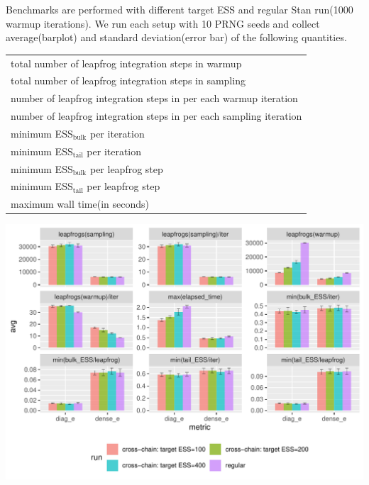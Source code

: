 \documentclass[landscape,a0paper,fontscale=0.45]{baposter} %
\newenvironment{ColFigure}
  {\par\medskip\noindent\minipage{\linewidth}}
  {\endminipage\par\medskip}
\begin{document}
\begin{poster}
{\begin{multicols}{2}
\vspace{1em}
Benchmarks are performed with different target ESS and
regular Stan run(1000 warmup iterations).
We run each setup with 10 PRNG seeds and collect average(barplot) and
standard deviation(error bar) of the following quantities.
\begin{center}
\footnotesize
\begin{tabular}{l}
\hline
total number of leapfrog integration steps in warmup \\
total number of leapfrog integration steps in sampling \\
number of leapfrog integration steps in per each warmup iteration \\
number of leapfrog integration steps in per each sampling iteration \\
minimum ESS\(_{\text{bulk}}\) per iteration \\
minimum ESS\(_{\text{tail}}\) per iteration \\
minimum ESS\(_{\text{bulk}}\) per leapfrog step \\
minimum ESS\(_{\text{tail}}\) per leapfrog step \\
maximum wall time(in seconds) \\
\hline
\end{tabular}
\end{center}

\begin{ColFigure}
\centering
\includegraphics[width=0.95\linewidth]{./figure/cross_chain_ess_effect_arK.pdf}
\end{ColFigure}


\end{multicols}}
\end{poster}
\end{document}
